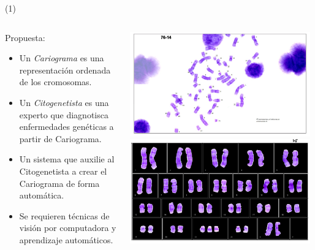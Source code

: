



\begin{frame}{ \footnotemark (1)}
\begin{columns}
\begin{column}{0.70\textwidth}
Propuesta:
		\begin{itemize}
		\item Un \textit{Cariograma} es una representación ordenada de los cromosomas.  
		\item Un \textit{Citogenetista} es una experto que diagnotisca enfermedades genéticas a partir de Cariograma.		
		\item Un sistema que auxilie al Citogenetista a crear el Cariograma de forma automática.
		\item Se requieren técnicas de visión por computadora y aprendizaje automáticos.
		\end{itemize}
\end{column}
\begin{column}{0.30\textwidth}  
    \begin{center}
     \includegraphics[width=0.98\textwidth]{Figs/Karyogram1}
     \includegraphics[width=0.98\textwidth]{Figs/Karyogram2}
     \end{center}
\end{column}
\end{columns}
\setcounter{footnote}{0}
\end{frame}


